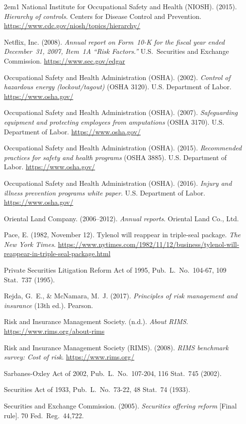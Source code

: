 \begin{hangparas}{2em}{1}
National Institute for Occupational Safety and Health (NIOSH). (2015).
\emph{Hierarchy of controls.} Centers for Disease Control and Prevention.
\url{https://www.cdc.gov/niosh/topics/hierarchy/}

Netflix, Inc. (2008). \emph{Annual report on Form~10-K for the fiscal year
ended December~31, 2007, Item~1A ``Risk Factors.''} U.S.\ Securities and
Exchange Commission. \url{https://www.sec.gov/edgar}

Occupational Safety and Health Administration (OSHA). (2002). \emph{Control of
hazardous energy (lockout/tagout)} (OSHA 3120). U.S. Department of Labor.
\url{https://www.osha.gov/}

Occupational Safety and Health Administration (OSHA). (2007).
\emph{Safeguarding equipment and protecting employees from amputations} (OSHA
3170). U.S. Department of Labor. \url{https://www.osha.gov/}

Occupational Safety and Health Administration (OSHA). (2015).
\emph{Recommended practices for safety and health programs} (OSHA 3885).
U.S. Department of Labor. \url{https://www.osha.gov/}

Occupational Safety and Health Administration (OSHA). (2016). \emph{Injury and
illness prevention programs white paper.} U.S. Department of Labor.
\url{https://www.osha.gov/}

Oriental Land Company. (2006--2012). \emph{Annual reports}. Oriental Land
Co., Ltd.

Pace, E. (1982, November 12). Tylenol will reappear in triple-seal package.
\emph{The New York Times}.
\url{https://www.nytimes.com/1982/11/12/business/tylenol-will-reappear-in-triple-seal-package.html}

Private Securities Litigation Reform Act of 1995, Pub.\ L.\ No.\ 104-67, 109
Stat.\ 737 (1995).

Rejda, G.~E., \& McNamara, M.~J. (2017). \emph{Principles of risk management
and insurance} (13th ed.). Pearson.

Risk and Insurance Management Society. (n.d.). \emph{About RIMS}.
\url{https://www.rims.org/about-rims}

Risk and Insurance Management Society (RIMS). (2008). \emph{RIMS benchmark
survey: Cost of risk}. \url{https://www.rims.org/}

Sarbanes-Oxley Act of 2002, Pub.\ L.\ No.\ 107-204, 116 Stat.\ 745 (2002).

Securities Act of 1933, Pub.\ L.\ No.\ 73-22, 48 Stat.\ 74 (1933).

Securities and Exchange Commission. (2005). \emph{Securities offering reform}
[Final rule]. 70 Fed.\ Reg.\ 44,722.


\end{hangparas}

